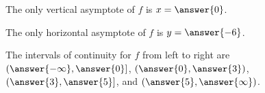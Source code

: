 \documentclass{ximera}
\begin{document}
\begin{exercise}
\begin{exercise}
The only vertical asymptote of $f$ is $x=\answer{0}$.

\begin{exercise}

The only horizontal asymptote of $f$ is $y=\answer{-6}$.

\begin{exercise}

The intervals of continuity for $f$ from left to right are $\left(\answer{-\infty},\answer{0}\right]$, $\left(\answer{0},\answer{3}\right)$, $\left(\answer{3},\answer{5}\right]$, and $\left(\answer{5},\answer{\infty}\right)$.

\end{exercise}
\end{exercise}
\end{exercise}
\end{exercise}
\end{document}
